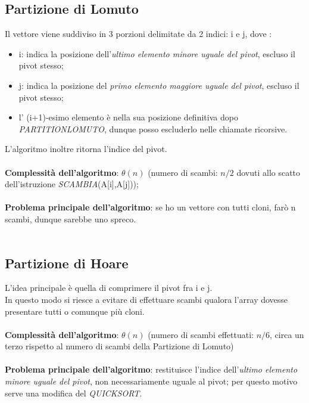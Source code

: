 \documentclass{article}
\begin{document}
        \subsection{Partizione di Lomuto}
            Il vettore viene suddiviso in 3 porzioni delimitate da 2 indici: i e j, dove :
            \begin{itemize}
                \item i: indica la posizione dell'\emph{ultimo elemento minore uguale del pivot}, escluso il pivot stesso;
                \item j: indica la posizione del \emph{primo elemento maggiore uguale del pivot}, escluso il pivot stesso;
                \item l' (i+1)-esimo elemento è nella sua posizione definitiva dopo \emph{PARTITIONLOMUTO}, dunque posso escluderlo nelle chiamate ricorsive.
            \end{itemize}
            L'algoritmo inoltre ritorna l'indice del pivot.\\
            \\
            \textbf{Complessità dell'algoritmo}: $\theta(n)$ (numero di scambi: $n/2$ dovuti allo scatto dell'istruzione \emph{SCAMBIA}(A[i],A[j]));
            \\
            \\
            \textbf{Problema principale dell'algoritmo}: se ho un vettore con tutti cloni, farò n scambi, dunque sarebbe uno spreco.\\
            \\
        \subsection{Partizione di Hoare}
            L'idea principale è quella di comprimere il pivot fra i e j.\\
            In questo modo si riesce a evitare di effettuare scambi qualora l'array dovesse presentare tutti o comunque più cloni.\\
            \\
            \textbf{Complessità dell'algoritmo}: $\theta(n)$ (numero di scambi effettuati: $n/6$, circa un terzo rispetto al numero di scambi della Partizione di Lomuto)\\
            \\
            \textbf{Problema principale dell'algoritmo}: restituisce l'indice dell'\emph{ultimo elemento minore uguale del pivot}, non necessariamente uguale al pivot; per questo motivo serve una modifica del \emph{QUICKSORT}.
\end{document}
